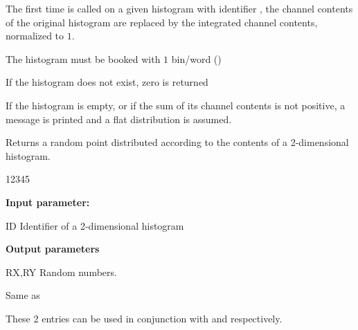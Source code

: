 \Remark
\begin{UL}
\item The first time  is called on a given histogram with identifier
, the channel contents of the original histogram are
replaced by the integrated channel contents, normalized to $1$.
\item The histogram  must be booked with $1$ bin/word ()
\item If the histogram  does not exist, zero is returned
\item If the histogram  is empty, or if the sum of
its channel contents is not positive, a message is printed
and a flat distribution is assumed.
\end{UL}
 
 
\Action
Returns a random point  distributed according to the
contents of a 2-dimensional histogram.
 
\begin{DLtt}{12345}
\item[{\rm\bf Input parameter:}]
\item[ID] Identifier of a 2-dimensional histogram
\item[{\rm\bf Output parameters}]
\item[RX,RY] Random numbers.
\end{DLtt}
 
\Remark
\begin{UL}
\item Same as 
\item These 2 entries can be used in conjunction with  and
 respectively.
\end{UL}
 
